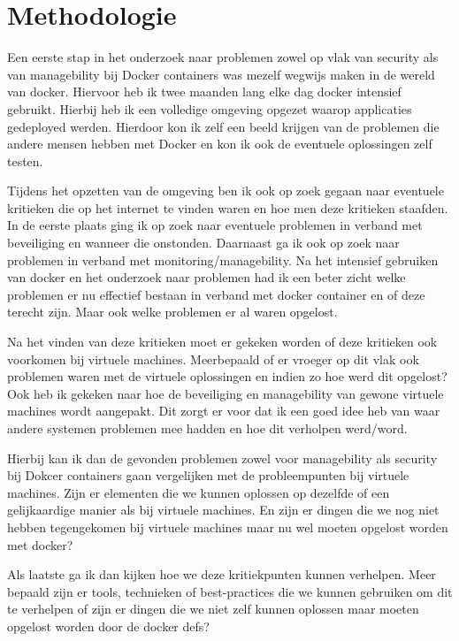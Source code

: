 \chapter{Methodologie}
\label{ch:methodologie}

Een eerste stap in het onderzoek naar problemen zowel op vlak van security als van managebility bij Docker containers was mezelf wegwijs maken in de wereld van docker. Hiervoor heb ik twee maanden lang elke dag docker intensief gebruikt. Hierbij heb ik een volledige omgeving opgezet waarop applicaties gedeployed werden. Hierdoor kon ik zelf een beeld krijgen van de problemen die andere mensen hebben met Docker en kon ik ook de eventuele oplossingen zelf testen.

Tijdens het opzetten van de omgeving ben ik ook op zoek gegaan naar eventuele kritieken die op het internet te vinden waren en hoe men deze kritieken staafden. In de eerste plaats ging ik op zoek naar eventuele problemen in verband met beveiliging en wanneer die onstonden. Daarnaast ga ik ook op zoek naar problemen in verband met monitoring/managebility. Na het intensief gebruiken van docker en het onderzoek naar problemen had ik een beter zicht welke problemen er nu effectief bestaan in verband met docker container en of deze terecht zijn. Maar ook welke problemen er al waren opgelost.

Na het vinden van deze kritieken moet er gekeken worden of deze kritieken ook voorkomen bij virtuele machines. Meerbepaald of er vroeger op dit vlak ook problemen waren met de virtuele oplossingen en indien zo hoe werd dit opgelost? Ook heb ik gekeken naar hoe de beveiliging en managebility van gewone virtuele machines wordt aangepakt. Dit zorgt er voor dat ik een goed idee heb van waar andere systemen problemen mee hadden en hoe dit verholpen werd/word.

Hierbij kan ik dan de gevonden problemen zowel voor managebility als security bij Dokcer containers gaan vergelijken met de probleempunten bij virtuele machines.  Zijn er elementen die we kunnen oplossen op dezelfde of een gelijkaardige manier als bij virtuele machines. En zijn er dingen die we nog niet hebben tegengekomen bij virtuele machines maar nu wel moeten opgelost worden met docker?

Als laatste ga ik dan kijken hoe we deze kritiekpunten kunnen verhelpen. Meer bepaald zijn er tools, technieken of best-practices die we kunnen gebruiken om dit te verhelpen of zijn er dingen die we niet zelf kunnen oplossen maar moeten opgelost worden door de docker defs?